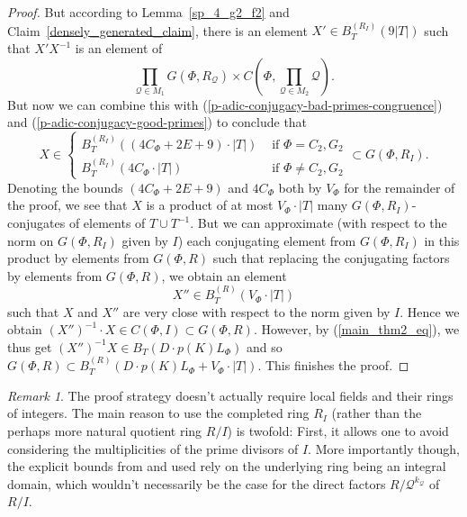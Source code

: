 \documentclass[12pt]{amsart}
\newcommand{\C}[1]{{\mathcal #1}}
\theoremstyle{definition}\newtheorem{definition}[theorem]{Definition}
\theoremstyle{remark}\newtheorem{remark}[theorem]{Remark}
\theoremstyle{definition}\newtheorem{case}{Case}
\begin{document}
\begin{proof}
But according to Lemma~\ref{sp_4_g2_f2} and Claim~\ref{densely_generated_claim}, there is an element $X'\in B_T^{(R_I)}(9|T|)$ such that $X'X^{-1}$ is an element of 
\[
\prod_{\C Q\in M_1}G(\Phi,R_{\C Q})\times C\left(\Phi,\prod_{\C Q\in M_2} \C Q\right).
\]
But now we can combine this with (\ref{p-adic-conjugacy-bad-primes-congruence}) and (\ref{p-adic-conjugacy-good-primes}) to conclude that 
\[
X\in 
\begin{cases}
B_T^{(R_I)}\left((4C_{\Phi}+2E+9)\cdot|T|\right)&\text{ if }\Phi=C_2,G_2\\
B_T^{(R_I)}\left(4C_{\Phi}\cdot|T|\right)&\text{ if }\Phi\neq C_2,G_2
\end{cases}
\subset G(\Phi,R_I).
\]
Denoting the bounds $(4C_{\Phi}+2E+9)$ and $4C_{\Phi}$ both by $V_{\Phi}$ for the remainder of the proof, we see that $X$ is a product of at most $V_{\Phi}\cdot|T|$ many $G(\Phi,R_I)$-conjugates of elements of $T\cup T^{-1}.$ But we can approximate (with respect to the norm on $G(\Phi,R_I)$ given by $I$) each conjugating element from $G(\Phi,R_I)$ in this product by elements from $G(\Phi,R)$ such that replacing the conjugating factors by elements from $G(\Phi,R)$, we obtain an element 
\[
X''\in B_T^{(R)}\left(V_{\Phi}\cdot|T|\right)
\]
such that $X$ and $X''$ are very close with respect to the norm given by $I.$ Hence we obtain $(X'')^{-1}\cdot X\in C(\Phi,I)\subset G(\Phi,R).$ However, by (\ref{main_thm2_eq}), we thus get $(X'')^{-1}X\in B_T(D\cdot p(K) L_{\Phi})$ and so $G(\Phi,R)\subset B_T^{(R)}\left(D\cdot p(K) L_{\Phi}+V_{\Phi}\cdot|T|\right).$ This finishes the proof.
\end{proof}  

\begin{remark}\label{post_thm0_remark}
The proof strategy doesn't actually require local fields and their rings of integers. The main reason to use the completed ring $R_I$ (rather than the perhaps more natural quotient ring $R/I$) is twofold: First, it allows one to avoid considering the multiplicities of the prime divisors of $I.$ More importantly though, the explicit bounds from \cite[Theorem~6.3]{KLM} and \cite[Theorem~2]{explicit_strong_bound_sp_2n} used rely on the underlying ring being an integral domain, which wouldn't necessarily be the case for the direct factors $R/\C Q^{k_{\C Q}}$ of $R/I$.
\end{remark}
\end{document}
